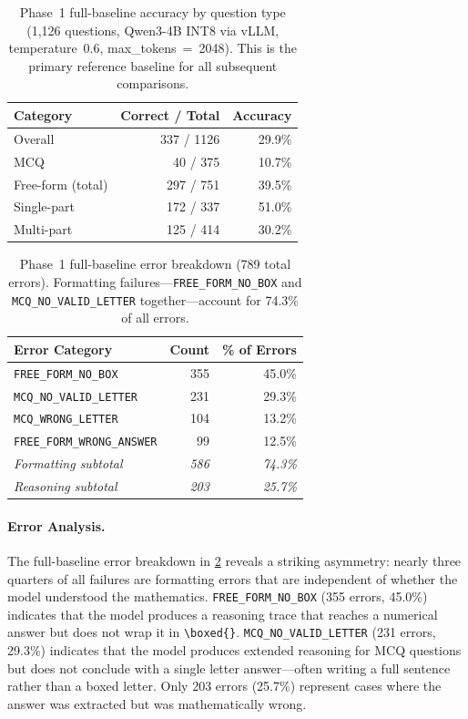 \documentclass{article}
\begin{document}
\begin{table}[h]
  \caption{Phase~1 full-baseline accuracy by question type (1,126 questions, Qwen3-4B INT8 via vLLM, temperature~0.6, max\_tokens~=~2048). This is the primary reference baseline for all subsequent comparisons.}
  \label{tab:fullbaseline}
  \centering
  \begin{tabular}{lrr}
    \toprule
    Category & Correct / Total & Accuracy \\
    \midrule
    Overall & 337 / 1126 & 29.9\% \\
    MCQ & 40 / 375 & 10.7\% \\
    Free-form (total) & 297 / 751 & 39.5\% \\
    \quad Single-part & 172 / 337 & 51.0\% \\
    \quad Multi-part & 125 / 414 & 30.2\% \\
    \bottomrule
  \end{tabular}
\end{table}

\begin{table}[h]
  \caption{Phase~1 full-baseline error breakdown (789 total errors). Formatting failures—\texttt{FREE\_FORM\_NO\_BOX} and \texttt{MCQ\_NO\_VALID\_LETTER} together—account for 74.3\% of all errors.}
  \label{tab:fullerrors}
  \centering
  \begin{tabular}{lrr}
    \toprule
    Error Category & Count & \% of Errors \\
    \midrule
    \texttt{FREE\_FORM\_NO\_BOX} & 355 & 45.0\% \\
    \texttt{MCQ\_NO\_VALID\_LETTER} & 231 & 29.3\% \\
    \texttt{MCQ\_WRONG\_LETTER} & 104 & 13.2\% \\
    \texttt{FREE\_FORM\_WRONG\_ANSWER} & 99 & 12.5\% \\
    \midrule
    \textit{Formatting subtotal} & \textit{586} & \textit{74.3\%} \\
    \textit{Reasoning subtotal} & \textit{203} & \textit{25.7\%} \\
    \bottomrule
  \end{tabular}
\end{table}

\paragraph{Error Analysis.}
The full-baseline error breakdown in \cref{tab:fullerrors} reveals a striking asymmetry: nearly three quarters of all failures are formatting errors that are independent of whether the model understood the mathematics. \texttt{FREE\_FORM\_NO\_BOX} (355 errors, 45.0\%) indicates that the model produces a reasoning trace that reaches a numerical answer but does not wrap it in \texttt{\textbackslash boxed\{\}}. \texttt{MCQ\_NO\_VALID\_LETTER} (231 errors, 29.3\%) indicates that the model produces extended reasoning for MCQ questions but does not conclude with a single letter answer—often writing a full sentence rather than a boxed letter. Only 203 errors (25.7\%) represent cases where the answer was extracted but was mathematically wrong.
\end{document}
